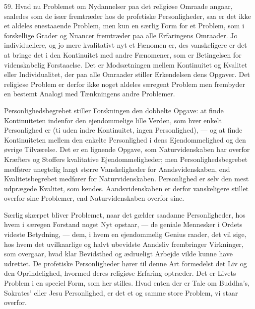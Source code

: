\documentclass[12pt,a4paper,openany]{book}
\newcommand{\opage}[1]{\marginnote{\footnotesize\textit{[#1]}}}
\begin{document}
59. Hvad nu Problemet om Nydannelser paa det religiøse Omraade angaar,
saaledes som de især fremtræder hos de profetiske Personligheder, saa er
det ikke et aldeles enestaaende Problem, men kun en særlig Form for et
Problem, som i forskellige Grader og Nuancer fremtræder paa alle
Erfaringens Omraader. Jo individuellere, og jo mere kvalitativt nyt et
Fænomen er, des vanskeligere er det at bringe det i den Kontinuitet med
andre Fænomener, som er Betingelsen for videnskabelig Forstaaelse. Det
er Modsætningen mellem Kontinuitet og Kvalitet eller Individualitet, der
paa alle Omraader stiller Erkendelsen dens Opgaver. Det religiøse
Problem er derfor ikke noget aldeles særegent Problem men frembyder en
bestemt Analogi med Tænkningens andre Problemer.

Personlighedsbegrebet stiller Forskningen den dobbelte Opgave: at finde
Kontinuiteten indenfor den ejendommelige lille Verden, som hver enkelt
Personlighed er (ti uden indre Kontinuitet, ingen Personlighed), --- og
at finde Kontinuiteten mellem
\opage{131}den enkelte Personlighed i dens Ejendommelighed og den øvrige
Tilværelse. Det er en lignende Opgave, som Naturvidenskaben har overfor
Kræfters og Stoffers kvalitative Ejendommeligheder; men
Personlighedsbegrebet medfører unegtelig langt større Vanskeligheder for
Aandsvidenskaben, end Kvalitetsbegrebet medfører for Naturvidenskaben.
Personlighed er selv den mest udprægede Kvalitet, som kendes.
Aandsvidenskaben er derfor vanskeligere stillet overfor sine Problemer,
end Naturvidenskaben overfor sine.

Særlig skærpet bliver Problemet, naar det gælder saadanne
Personligheder, hos hvem i særegen Forstand noget Nyt opstaar, --- de
geniale Mennesker i Ordets videste Betydning, --- dem, i hvem en
ejendommelig Genius raader, det vil sige, hos hvem det uvilkaarlige og
halvt ubevidste Aandsliv frembringer Virkninger, som overgaar, hvad klar
Bevidsthed og ædrueligt Arbejde vilde kunne have udrettet. De profetiske
Personligheder hører til denne Art formedelst det Liv og den
Oprindelighed, hvormed deres religiøse Erfaring optræder. Det er Livets
Problem i en speciel Form, som her stilles. Hvad enten der er Tale om
Buddha’s, Sokrates’ eller Jesu Personlighed, er det et og samme store
Problem, vi staar overfor.
\end{document}
